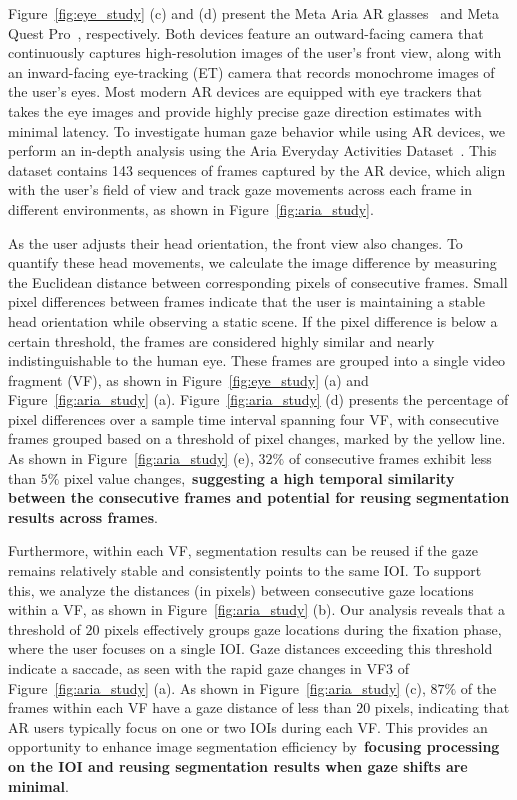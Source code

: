 \documentclass{article}
\begin{document}
Figure~\ref{fig:eye_study} (c) and (d) present the Meta Aria AR glasses~\cite{engel2023project} and Meta Quest Pro~\cite{quest_pro}, respectively. Both devices feature an outward-facing camera that continuously captures high-resolution images of the user's front view, along with an inward-facing eye-tracking (ET) camera that records monochrome images of the user's eyes. Most modern AR devices are equipped with eye trackers that takes the eye images and provide highly precise gaze direction estimates with minimal latency.
To investigate human gaze behavior while using AR devices, we perform an in-depth analysis using the Aria Everyday Activities Dataset~\cite{lv2024ariaeverydayactivitiesdataset}. This dataset contains 143 sequences of frames captured by the AR device, which align with the user's field of view and track gaze movements across each frame in different environments, as shown in Figure~\ref{fig:aria_study}.

As the user adjusts their head orientation, the front view also changes. To quantify these head movements, we calculate the image difference by measuring the Euclidean distance between corresponding pixels of consecutive frames. Small pixel differences between frames indicate that the user is maintaining a stable head orientation while observing a static scene. If the pixel difference is below a certain threshold, the frames are considered highly similar and nearly indistinguishable to the human eye. These frames are grouped into a single video fragment (VF), as shown in Figure~\ref{fig:eye_study} (a) and Figure~\ref{fig:aria_study} (a). Figure~\ref{fig:aria_study} (d) presents the percentage of pixel differences over a sample time interval spanning four VF, with consecutive frames grouped based on a threshold of pixel changes, marked by the yellow line. As shown in Figure~\ref{fig:aria_study} (e), $32\%$ of consecutive frames exhibit less than $5\%$ pixel value changes,~\textbf{suggesting a high temporal similarity between the consecutive frames and potential for reusing segmentation results across frames}.

Furthermore, within each VF, segmentation results can be reused if the gaze remains relatively stable and consistently points to the same IOI. To support this, we analyze the distances (in pixels) between consecutive gaze locations within a VF, as shown in Figure~\ref{fig:aria_study} (b). Our analysis reveals that a threshold of \(20\) pixels effectively groups gaze locations during the fixation phase, where the user focuses on a single IOI. Gaze distances exceeding this threshold indicate a saccade, as seen with the rapid gaze changes in VF3 of Figure~\ref{fig:aria_study} (a). As shown in Figure~\ref{fig:aria_study} (c), \(87\%\) of the frames within each VF have a gaze distance of less than \(20\) pixels, indicating that AR users typically focus on one or two IOIs during each VF. This provides an opportunity to enhance image segmentation efficiency by~\textbf{focusing processing on the IOI and reusing segmentation results when gaze shifts are minimal}.
\end{document}
